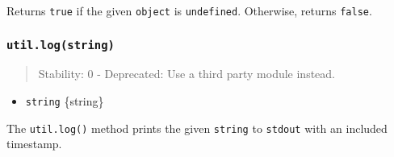 Returns \texttt{true} if the given \texttt{object} is
\texttt{undefined}. Otherwise, returns \texttt{false}.

\begin{Shaded}
\begin{Highlighting}[]
\OperatorTok{=} \NormalTok{(}\NormalTok{)}\OperatorTok{;}

\OperatorTok{=} \OperatorTok{;}
\NormalTok{(}\NormalTok{)}\OperatorTok{;}
\OperatorTok{;}
\NormalTok{(}\NormalTok{)}\OperatorTok{;}
\end{Highlighting}
\end{Shaded}

\subsubsection{\texorpdfstring{\texttt{util.log(string)}}{util.log(string)}}\label{util.logstring}

\begin{quote}
Stability: 0 - Deprecated: Use a third party module instead.
\end{quote}

\begin{itemize}
\tightlist
\item
  \texttt{string} \{string\}
\end{itemize}

The \texttt{util.log()} method prints the given \texttt{string} to
\texttt{stdout} with an included timestamp.

\begin{Shaded}
\begin{Highlighting}[]
\OperatorTok{=} \NormalTok{(}\NormalTok{)}\OperatorTok{;}

\NormalTok{(}\NormalTok{)}\OperatorTok{;}
\end{Highlighting}
\end{Shaded}
